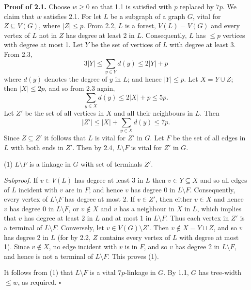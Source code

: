 \textbf{Proof of 2.1.} Choose $w \ge 0$ so that 1.1 is satisfied with $p$ replaced by $7p$. We claim that $w$ satisfies 2.1. For let $L$ be a subgraph of a graph $G$, vital for $Z \subseteq V(G)$, where $|Z| \le p$. From 2.2, $L$ is a forest, $V(L) = V(G)$ and every vertex of $L$ not in $Z$ has degree at least 2 in $L$. Consequently, $L$ has $\le p$ vertices with degree at most 1. Let $Y$ be the set of vertices of $L$ with degree at least 3. From 2.3,
\begin{equation*}
3|Y| \le \sum_{y \in Y} d(y) \le 2|Y| + p
\end{equation*}
where $d(y)$ denotes the degree of $y$ in $L$; and hence $|Y| \le p$. Let $X = Y \cup Z$; then $|X| \le 2p$, and so from 2.3 again,
\begin{equation*}
\sum_{y \in X} d(y) \le 2|X| + p \le 5p.
\end{equation*}
Let $Z'$ be the set of all vertices in $X$ and all their neighbours in $L$. Then
\begin{equation*}
|Z'| \le |X| + \sum_{y \in X} d(y) \le 7p.
\end{equation*}
Since $Z \subseteq Z'$ it follows that $L$ is vital for $Z'$ in $G$. Let $F$ be the set of all edges in $L$ with both ends in $Z'$. Then by 2.4, $L \setminus F$ is vital for $Z'$ in $G$.

\hspace*{12pt}(1) $L \setminus F$ is a linkage in $G$ with set of terminals $Z'$.

\textit{Subproof.} If $v \in V(L)$ has degree at least 3 in $L$ then $v \in Y \subseteq X$ and so all edges of $L$ incident with $v$ are in $F$; and hence $v$ has degree 0 in $L \setminus F$. Consequently, every vertex of $L \setminus F$ has degree at most 2. If $v \in Z'$, then either $v \in X$ and hence $v$ has degree 0 in $L \setminus F$, or $v \notin X$ and $v$ has a neighbour in $X$ in $L$, which implies that $v$ has degree at least 2 in $L$ and at most 1 in $L \setminus F$. Thus each vertex in $Z'$ is a terminal of $L \setminus F$. Conversely, let $v \in V(G) \setminus Z'$. Then $v \notin X = Y \cup Z$, and so $v$ has degree 2 in $L$ (for by 2.2, $Z$ contains every vertex of $L$ with degree at most 1). Since $v \notin X$, no edge incident with $v$ is in $F$, and so $v$ has degree 2 in $L \setminus F$, and hence is not a terminal of $L \setminus F$. This proves (1).

It follows from (1) that $L \setminus F$ is a vital $7p$-linkage in $G$. By 1.1, $G$ has tree-width $\le w$, as required. $\square$

